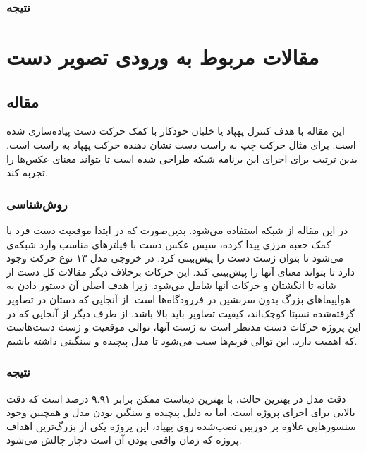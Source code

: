 \subsubsection{نتیجه}

\cite{hu2020deep}


\section{مقالات مربوط به ورودی تصویر دست}


\subsection{مقاله }
این مقاله با هدف کنترل پهپاد یا خلبان خودکار با کمک حرکت دست پیاده‌سازی شده است. برای مثال حرکت چپ به راست دست نشان دهنده حرکت پهپاد به راست است. بدین ترتیب برای اجرای این برنامه شبکه  طراحی شده است تا یتواند معنای عکس‌ها را تجربه کند.

\subsubsection{روش‌شناسی}
در این مقاله از شبکه‌‌  استفاده می‌شود. بدین‌صورت که در ابتدا موقعیت دست فرد با کمک جعبه مرزی  پیدا کرده، سپس عکس دست با فیلترهای مناسب وارد شبکه‌ی  می‌شود تا بتوان ژست دست را پیش‌بینی کرد. در خروجی مدل ۱۳ نوع حرکت وجود دارد تا بتواند معنای آنها را پیش‌بینی کند. این حرکات برخلاف دیگر مقالات کل دست از شانه تا انگشتان و حرکات آنها شامل می‌شود. زیرا هدف اصلی آن دستور دادن به هواپیما‌های
 بزرگ بدون سرنشین در فررودگاه‌ها است. از آنجایی که دستان در تصاویر گرفته‌شده نسبتا کوچک‌اند، کیفیت تصاویر باید بالا باشد. از طرف دیگر از آنجایی که در این پروژه حرکات دست مدنظر است نه ژست آنها، توالی موقعیت و ژست دست‌هاست که اهمیت دارد. این توالی فریم‌ها سبب می‌شود تا مدل پیچیده و سنگینی داشته باشیم.

\subsubsection{نتیجه}
دقت مدل در بهترین حالت، با بهترین دیتاست ممکن برابر ۹.۹۱ درصد است که دقت بالایی برای اجرای پروژه است. اما به دلیل پیچیده و سنگین بودن مدل و همچنین وجود سنسور‌هایی علاوه بر دوربین نصب‌شده روی پهپاد، این پروژه یکی از بزرگ‌ترین اهداف پروژه که زمان واقعی بودن آن است دچار چالش می‌شود.\cite{perera2018uav}




